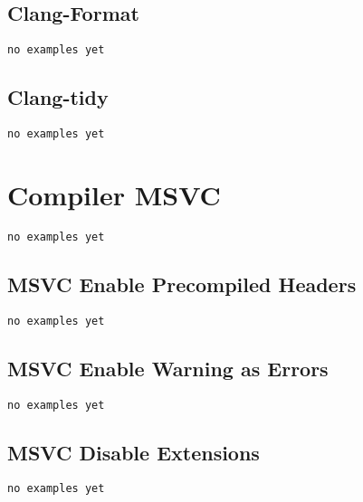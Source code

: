 \subsection{Clang-Format}

\begin{verbatim}
no examples yet
\end{verbatim}

\subsection{Clang-tidy}

\begin{verbatim}
no examples yet
\end{verbatim}


\section{Compiler MSVC}

\begin{verbatim}
no examples yet
\end{verbatim}

\subsection{MSVC Enable Precompiled Headers}

\begin{verbatim}
no examples yet
\end{verbatim}

\subsection{MSVC Enable Warning as Errors}

\begin{verbatim}
no examples yet
\end{verbatim}

\subsection{MSVC Disable Extensions}

\begin{verbatim}
no examples yet
\end{verbatim}
